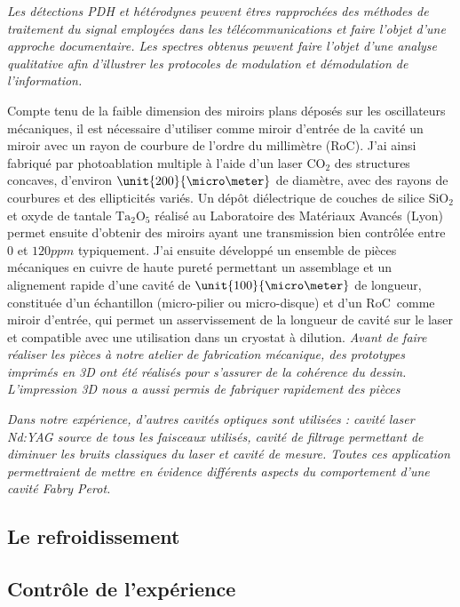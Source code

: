 \documentclass[12pt,a4paper]{article}
\newcommand{\uroc}{\micro RoC}
\begin{document}
\textit{Les détections PDH et hétérodynes peuvent êtres rapprochées des méthodes de traitement du signal employées dans les télécommunications et faire l'objet d'une approche documentaire.
Les spectres obtenus peuvent faire l'objet d'une analyse qualitative afin d'illustrer les protocoles de modulation et démodulation de l'information.}

Compte tenu de la faible dimension des miroirs plans déposés sur les oscillateurs mécaniques, il est nécessaire d'utiliser comme miroir d'entrée de la cavité un miroir avec un rayon de courbure de l'ordre du millimètre (\uroc).
J'ai ainsi fabriqué par photoablation multiple à l'aide d'un laser $\mathrm{CO_2}$ des structures concaves, d'environ $\unit{200}{\micro\meter}$ de diamètre, avec des rayons de courbures et des ellipticités variés.
Un dépôt diélectrique de couches de silice $\mathrm{SiO_2}$ et oxyde de tantale $\mathrm{Ta_2O_5}$ réalisé au Laboratoire des Matériaux Avancés (Lyon) permet ensuite d'obtenir des miroirs ayant une transmission bien contrôlée entre 0 et $\unit{120}{ppm}$ typiquement.
J'ai ensuite développé un ensemble de pièces mécaniques en cuivre de haute pureté permettant un assemblage et un alignement rapide d'une cavité de $\unit{100}{\micro\meter}$ de longueur, constituée d'un échantillon (micro-pilier ou micro-disque) et d'un \uroc\ comme miroir d'entrée, qui permet un asservissement de la longueur de cavité sur le laser et compatible avec une utilisation dans un cryostat à dilution.
\textit{Avant de faire réaliser les pièces à notre atelier de fabrication mécanique, des prototypes imprimés en 3D ont été réalisés pour s'assurer de la cohérence du dessin.
L'impression 3D nous a aussi permis de fabriquer rapidement des pièces }

\textit{Dans notre expérience, d'autres cavités optiques sont utilisées : cavité laser Nd:YAG source de tous les faisceaux utilisés, cavité de filtrage permettant de diminuer les bruits classiques du laser et cavité de mesure.
Toutes ces application permettraient de mettre en évidence différents aspects du comportement d'une cavité Fabry Perot.
}

\subsection{Le refroidissement}

\subsection{Contrôle de l'expérience}
\end{document}

